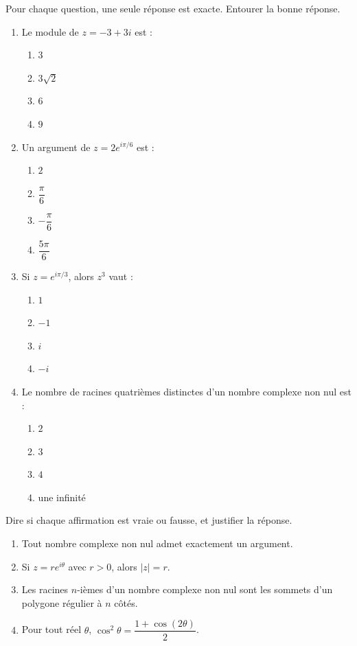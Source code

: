 \documentclass[11pt]{article}
\begin{document}
\begin{exercice}
Pour chaque question, une seule réponse est exacte. Entourer la bonne réponse.
\begin{enumerate}
\item Le module de $z = -3 + 3i$ est :
\begin{enumerate}
\item $3$ \quad \item $3\sqrt{2}$ \quad \item $6$ \quad \item $9$
\end{enumerate}
\item Un argument de $z = 2e^{i\pi/6}$ est :
\begin{enumerate}
\item $2$ \quad \item $\dfrac{\pi}{6}$ \quad \item $-\dfrac{\pi}{6}$ \quad \item $\dfrac{5\pi}{6}$
\end{enumerate}
\item Si $z = e^{i\pi/3}$, alors $z^3$ vaut :
\begin{enumerate}
\item $1$ \quad \item $-1$ \quad \item $i$ \quad \item $-i$
\end{enumerate}
\item Le nombre de racines quatrièmes distinctes d'un nombre complexe non nul est :
\begin{enumerate}
\item $2$ \quad \item $3$ \quad \item $4$ \quad \item une infinité
\end{enumerate}
\end{enumerate}
\end{exercice}

\begin{exercice}
Dire si chaque affirmation est vraie ou fausse, et justifier la réponse.
\begin{enumerate}
\item Tout nombre complexe non nul admet exactement un argument.
\item Si $z = re^{i\theta}$ avec $r > 0$, alors $|z| = r$.
\item Les racines $n$-ièmes d'un nombre complexe non nul sont les sommets d'un polygone régulier à $n$ côtés.
\item Pour tout réel $\theta$, $\cos^2\theta = \dfrac{1 + \cos(2\theta)}{2}$.
\end{enumerate}
\end{exercice}
\end{document}

